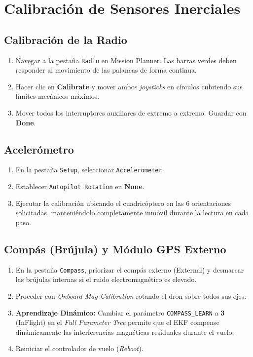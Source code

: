 \documentclass[12pt,a4paper]{article}
\begin{document}
\section{Calibración de Sensores Inerciales}

\subsection{Calibración de la Radio}
\begin{enumerate}[leftmargin=*]
    \item Navegar a la pestaña \texttt{Radio} en Mission Planner. Las barras verdes deben responder al movimiento de las palancas de forma continua.
    \item Hacer clic en \textbf{Calibrate} y mover ambos \textit{joysticks} en círculos cubriendo sus límites mecánicos máximos.
    \item Mover todos los interruptores auxiliares de extremo a extremo. Guardar con \textbf{Done}.
\end{enumerate}

\subsection{Acelerómetro}
\begin{enumerate}[leftmargin=*]
    \item En la pestaña \texttt{Setup}, seleccionar \texttt{Accelerometer}.
    \item Establecer \texttt{Autopilot Rotation} en \textbf{None}.
    \item Ejecutar la calibración ubicando el cuadricóptero en las 6 orientaciones solicitadas, manteniéndolo completamente inmóvil durante la lectura en cada paso.
\end{enumerate}

\subsection{Compás (Brújula) y Módulo GPS Externo}
\begin{enumerate}[leftmargin=*]
    \item En la pestaña \texttt{Compass}, priorizar el compás externo (External) y desmarcar las brújulas internas si el ruido electromagnético es elevado.
    \item Proceder con \textit{Onboard Mag Calibration} rotando el dron sobre todos sus ejes.
    \item \textbf{Aprendizaje Dinámico:} Cambiar el parámetro \texttt{COMPASS\_LEARN} a \textbf{3} (InFlight) en el \textit{Full Parameter Tree} permite que el EKF compense dinámicamente las interferencias magnéticas residuales durante el vuelo.
    \item Reiniciar el controlador de vuelo (\textit{Reboot}).
\end{enumerate}
\end{document}

